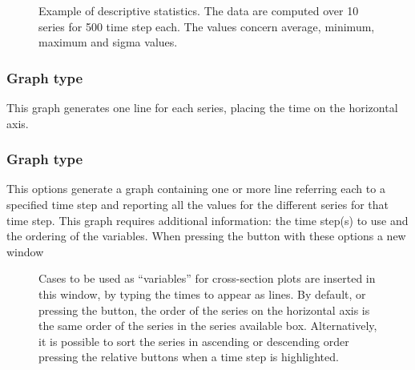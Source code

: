 \documentclass [11pt,a4paper] {book}
\begin{document}
\begin{figure}[ht]
  \centering
  \caption{\small Example of descriptive statistics. The data are computed over 10 series for 500 time step each. The values concern average, minimum, maximum and sigma values.} 
  \label{fig:ex_statistics}
\end{figure}

\clearpage

\subsubsection{Graph type }

This graph generates one line for each series, placing the time on the horizontal axis. 


\subsubsection{Graph type }
This options generate a graph containing one or more line referring each to a specified time step and reporting all the values for the different series for that time step. This graph requires additional information: the time step(s) to use and the ordering of the variables. When pressing the button  with these options a new window

\begin{figure}[ht]
  \centering
  \caption{\small Cases to be used as ``variables'' for cross-section plots are inserted in this window, by typing the times to appear as lines. By default, or pressing the  button, the order of the series on the horizontal axis is the same order of the series in the series available box. Alternatively, it is possible to sort the series in ascending or descending order pressing the relative buttons when a time step is highlighted.}
  \label{fig:crossection}
\end{figure}
\end{document}
